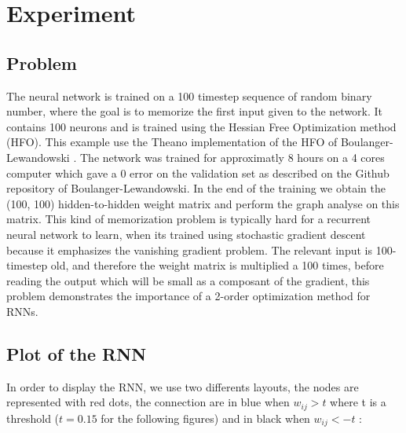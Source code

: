 \section{Experiment}

\subsection{Problem}

The neural network is trained on a 100 timestep sequence of random binary number, where the goal is to memorize the first input given to the network. It contains 100 neurons and is trained using the Hessian Free Optimization method (HFO). This example use the Theano implementation of the HFO of Boulanger-Lewandowski \cite{boulanger2012modeling}. The network was trained for approximatly 8 hours on a 4 cores computer which gave a 0 error on the validation set as described on the Github repository of Boulanger-Lewandowski. In the end of the training we obtain the (100, 100) hidden-to-hidden weight matrix and perform the graph analyse on this matrix. This kind of memorization problem is typically hard for a recurrent neural network to learn, when its trained using stochastic gradient descent because it emphasizes the vanishing gradient problem. The relevant input is 100-timestep old, and therefore the weight matrix is multiplied a 100 times, before reading the output which will be small as a composant of the gradient, this problem demonstrates the importance of a 2-order optimization method for RNNs. 

\subsection{Plot of the RNN}

In order to display the RNN, we use two differents layouts, the nodes are represented with red dots, the connection are in blue when $w_{ij}  > t $ where t is a threshold ($ t=0.15$ for the following figures) and in black when $w_{ij} < - t$  :

